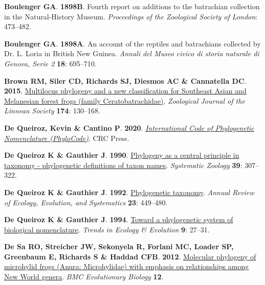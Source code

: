 \documentclass[
  letterpaper,
  DIV=11,
  numbers=noendperiod]{scrartcl}
\newlength{\cslhangindent}
\newenvironment{CSLReferences}[2] %
 {\begin{list}{}{%
  \setlength{\itemindent}{0pt}
  \setlength{\leftmargin}{0pt}
  \setlength{\parsep}{0pt}
  \ifodd #1
   \setlength{\leftmargin}{\cslhangindent}
   \setlength{\itemindent}{-1\cslhangindent}
  \fi
  \setlength{\itemsep}{#2\baselineskip}}}
 {\end{list}}
\begin{document}
\begin{CSLReferences}{0}{1}
\textbf{\textbf{Boulenger GA}}. \textbf{1898B}. {Fourth report on
additions to the batrachian collection in the Natural-History Museum}.
\emph{Proceedings of the Zoological Society of London}: 473--482.

\textbf{\textbf{Boulenger GA}}. \textbf{1898A}. {An account of the
reptiles and batrachians collected by Dr. L. Loria in British New
Guinea}. \emph{Annali del Museo civico di storia naturale di Genova,
Serie 2} \textbf{18}: 695--710.

\textbf{\textbf{Brown RM}, \textbf{Siler CD}, \textbf{Richards SJ},
\textbf{Diesmos AC} \& \textbf{Cannatella DC}}. \textbf{2015}.
\href{https://doi.org/10.1111/zoj.12232}{{Multilocus phylogeny and a new
classification for Southeast Asian and Melanesian forest frogs (family
Ceratobatrachidae)}}. \emph{Zoological Journal of the Linnean Society}
\textbf{174}: 130--168.

\textbf{\textbf{De Queiroz, Kevin} \& \textbf{Cantino P}}.
\textbf{2020}.
\emph{\href{https://doi.org/10.1201/9780429446320}{{International Code
of Phylogenetic Nomenclature (PhyloCode)}}}. CRC Press.

\textbf{\textbf{De Queiroz K} \& \textbf{Gauthier J}}. \textbf{1990}.
\href{https://doi.org/10.2307/2992353}{{Phylogeny as a central principle
in taxonomy - phylogenetic definitions of taxon names}}.
\emph{Systematic Zoology} \textbf{39}: 307--322.

\textbf{\textbf{De Queiroz K} \& \textbf{Gauthier J}}. \textbf{1992}.
\href{https://doi.org/10.1146/annurev.ecolsys.23.1.449}{{Phylogenetic
taxonomy}}. \emph{{Annual Review of Ecology, Evolution, and
Systematics}} \textbf{23}: 449--480.

\textbf{\textbf{De Queiroz K} \& \textbf{Gauthier J}}. \textbf{1994}.
\href{https://doi.org/10.1016/0169-5347(94)90231-3}{{Toward a
phylogenetic system of biological nomenclature}}. \emph{{Trends in
Ecology \& Evolution}} \textbf{9}: 27--31.

\textbf{\textbf{De Sa RO}, \textbf{Streicher JW}, \textbf{Sekonyela R},
\textbf{Forlani MC}, \textbf{Loader SP}, \textbf{Greenbaum E},
\textbf{Richards S} \& \textbf{Haddad CFB}}. \textbf{2012}.
\href{https://doi.org/\%7B10.1186/1471-2148-12-241\%7D}{{Molecular
phylogeny of microhylid frogs (Anura: Microhylidae) with emphasis on
relationships among New World genera}}. \emph{{BMC Evolutionary
Biology}} \textbf{{12}}.


\end{CSLReferences}
\end{document}
